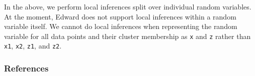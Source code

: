 In the above, we perform local inferences split over individual random
variables. At the moment, Edward does not support local inferences
within a random variable itself. We cannot do local inferences when
representing the random variable for all data points and their cluster
membership as \texttt{x} and \texttt{z} rather than \texttt{x1},
\texttt{x2}, \texttt{z1}, and \texttt{z2}.

\subsubsection{References}\label{references}

